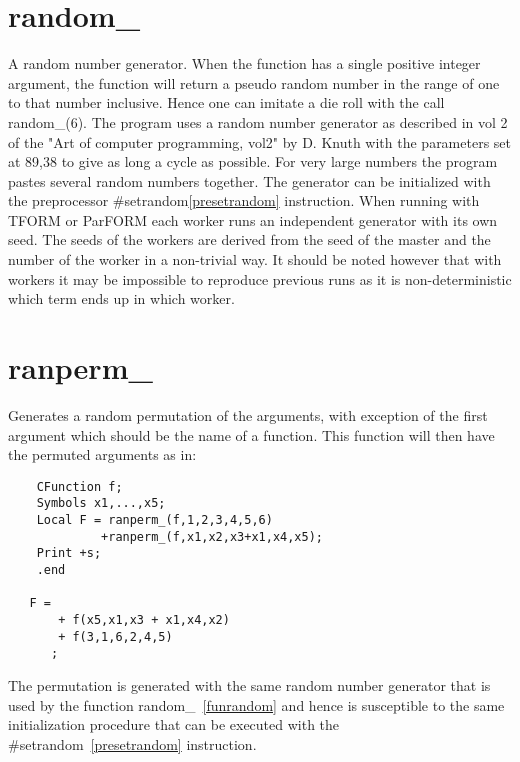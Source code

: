 
\section{random\_}
\label{funrandom}
\noindent A random number generator. When the function has a single 
positive integer argument, the function will return a pseudo random number 
in the range of one to that number inclusive. Hence one can imitate a die 
roll with the call random\_(6). The program uses a random number generator 
as described in vol 2 of the "Art of computer programming, vol2" by D. 
Knuth with the parameters set at 89,38 to give as long a cycle as possible. 
For very large numbers the program pastes several random numbers together. 
The generator can be initialized with the preprocessor 
\#setrandom\ref{presetrandom} instruction. When running 
with TFORM or ParFORM each worker runs an independent generator with its 
own seed. The seeds of the workers are derived from the seed of the master 
and the number of the worker in a non-trivial way. It should be noted 
however that with workers it may be impossible to reproduce previous runs 
as it is non-deterministic which term ends up in which worker.


\section{ranperm\_}
\label{funranperm}
\noindent Generates a random permutation of the arguments, with exception 
of the first argument which should be the name of a function. This function 
will then have the permuted arguments as in:
\begin{verbatim}
    CFunction f;
    Symbols x1,...,x5;
    Local F = ranperm_(f,1,2,3,4,5,6)
             +ranperm_(f,x1,x2,x3+x1,x4,x5);
    Print +s;
    .end

   F =
       + f(x5,x1,x3 + x1,x4,x2)
       + f(3,1,6,2,4,5)
      ;
\end{verbatim}
The permutation is generated with the same random number generator that is 
used by the function 
random\_~\ref{funrandom} and hence 
is susceptible to the same initialization procedure that can be executed 
with the \#setrandom~\ref{presetrandom} instruction.

